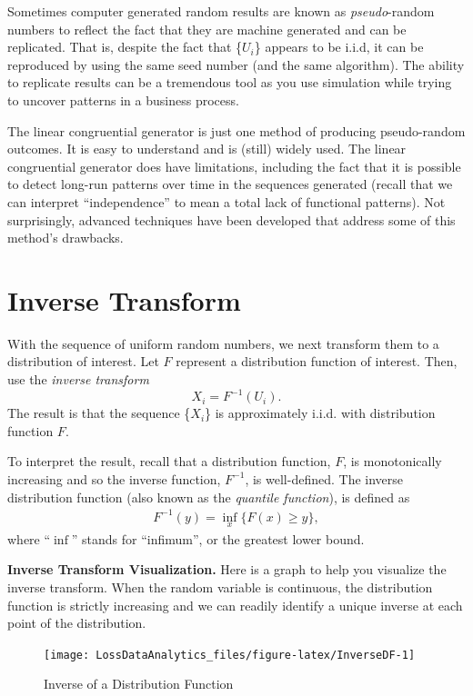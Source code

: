 \documentclass[]{book}
\theoremstyle{definition}
\theoremstyle{definition}
\theoremstyle{definition}
\theoremstyle{remark}
\begin{document}
Sometimes computer generated random results are known as
\emph{pseudo}-random numbers to reflect the fact that they are machine
generated and can be replicated. That is, despite the fact that
\{\(U_{i}\)\} appears to be i.i.d, it can be reproduced by using the
same seed number (and the same algorithm). The ability to replicate
results can be a tremendous tool as you use simulation while trying to
uncover patterns in a business process.

The linear congruential generator is just one method of producing
pseudo-random outcomes. It is easy to understand and is (still) widely
used. The linear congruential generator does have limitations, including
the fact that it is possible to detect long-run patterns over time in
the sequences generated (recall that we can interpret ``independence''
to mean a total lack of functional patterns). Not surprisingly, advanced
techniques have been developed that address some of this method's
drawbacks.

\section{Inverse Transform}\label{inverse-transform}

With the sequence of uniform random numbers, we next transform them to a
distribution of interest. Let \(F\) represent a distribution function of
interest. Then, use the \emph{inverse transform}
\[X_i=F^{-1}\left( U_i \right) .\] The result is that the sequence
\{\(X_{i}\)\} is approximately i.i.d. with distribution function \(F\).

To interpret the result, recall that a distribution function, \(F\), is
monotonically increasing and so the inverse function, \(F^{-1}\), is
well-defined. The inverse distribution function (also known as the
\emph{quantile function}), is defined as \[\begin{aligned}
F^{-1}(y) = \inf_x \{ F(x) \ge y \} ,\end{aligned}\] where ``\(\inf\)''
stands for ``infimum'', or the greatest lower bound.

\textbf{Inverse Transform Visualization.} Here is a graph to help you
visualize the inverse transform. When the random variable is continuous,
the distribution function is strictly increasing and we can readily
identify a unique inverse at each point of the distribution.

\begin{figure}

{\centering \texttt{[image: LossDataAnalytics\_files/figure-latex/InverseDF-1]} 

}

\caption{Inverse of a Distribution Function}\label{fig:InverseDF}
\end{figure}
\end{document}
